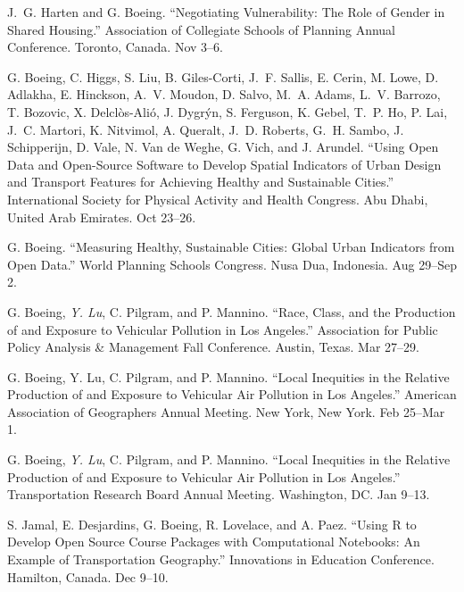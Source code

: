 \documentclass[11pt,letterpaper]{report} %
\begin{document}
\begin{tablist}
\item[2022] \tab{}J.~G. Harten and G. Boeing. \enquote{Negotiating Vulnerability: The Role of Gender in Shared Housing.} Association of Collegiate Schools of Planning Annual Conference. Toronto, Canada. Nov 3--6.

\item[2022] \tab{}G. Boeing, C. Higgs, S. Liu, B. Giles-Corti, J.~F. Sallis, E. Cerin, M. Lowe, D. Adlakha, E. Hinckson, A.~V. Moudon, D. Salvo, M.~A. Adams, L.~V. Barrozo, T. Bozovic, X. Delclòs-Alió, J. Dygrýn, S. Ferguson, K. Gebel, T.~P. Ho, P. Lai, J.~C. Martori, K. Nitvimol, A. Queralt, J.~D. Roberts, G.~H. Sambo, J. Schipperijn, D. Vale, N. Van de Weghe, G. Vich, and J. Arundel. \enquote{Using Open Data and Open-Source Software to Develop Spatial Indicators of Urban Design and Transport Features for Achieving Healthy and Sustainable Cities.} International Society for Physical Activity and Health Congress. Abu Dhabi, United Arab Emirates. Oct 23--26.

\item[2022] \tab{}G. Boeing. \enquote{Measuring Healthy, Sustainable Cities: Global Urban Indicators from Open Data.} World Planning Schools Congress. Nusa Dua, Indonesia. Aug 29--Sep 2.

\item[2022] \tab{}G. Boeing, \textit{Y. Lu}, C. Pilgram, and P. Mannino. \enquote{Race, Class, and the Production of and Exposure to Vehicular Pollution in Los Angeles.} Association for Public Policy Analysis \& Management Fall Conference. Austin, Texas. Mar 27--29.

\item[2022] \tab{}G. Boeing, Y. Lu, C. Pilgram, and P. Mannino. \enquote{Local Inequities in the Relative Production of and Exposure to Vehicular Air Pollution in Los Angeles.} American Association of Geographers Annual Meeting. New York, New York. Feb 25--Mar 1.

\item[2022] \tab{}G. Boeing, \textit{Y. Lu}, C. Pilgram, and P. Mannino. \enquote{Local Inequities in the Relative Production of and Exposure to Vehicular Air Pollution in Los Angeles.} Transportation Research Board Annual Meeting. Washington, DC\@. Jan 9--13.

\item[2021] \tab{}S. Jamal, E. Desjardins, G. Boeing, R. Lovelace, and A. Paez. \enquote{Using R to Develop Open Source Course Packages with Computational Notebooks: An Example of Transportation Geography.} Innovations in Education Conference. Hamilton, Canada. Dec 9--10.


\end{tablist}
\end{document}
